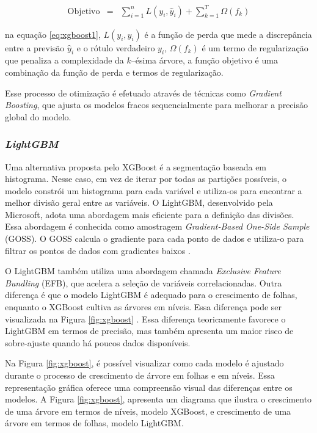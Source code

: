\begin{eqnarray}
	 \text{Objetivo} &=& \sum_{i=1}^{n} L(y_i, \hat{y}_i) + \sum_{k=1}^{T} \Omega(f_k) \label{eq:xgboost1}
\end{eqnarray}

 
 \noindent na equação \eqref{eq:xgboost1}, $ L(y_i, \hat{y}_i) $ é a função de perda que mede a discrepância entre a previsão $ \hat{y}_i $ e o rótulo verdadeiro $ y_i $, $ \Omega(f_k) $ é um termo de regularização que penaliza a complexidade da $ k $--ésima árvore, a função objetivo é uma combinação da função de perda e termos de regularização.
 
 Esse processo de otimização é efetuado através de técnicas como \textit{Gradient Boosting}, que ajusta os modelos fracos sequencialmente para melhorar a precisão global do modelo.
 

 
 \subsubsection{\textit{LightGBM}}
 
 Uma alternativa proposta pelo XGBoost é a segmentação baseada em histograma. Nesse caso, em vez de iterar por todas as partições possíveis, o modelo constrói um histograma para cada variável e utiliza-os para encontrar a melhor divisão geral entre as variáveis. O LightGBM, desenvolvido pela Microsoft, adota uma abordagem mais eficiente para a definição das divisões. Essa abordagem é conhecida como amostragem \textit{Gradient-Based One-Side Sample} (GOSS). O GOSS calcula o gradiente para cada ponto de dados e utiliza-o para filtrar os pontos de dados com gradientes baixos \cite{SUN2020101084}. 
 
 O LightGBM também utiliza uma abordagem chamada \textit{Exclusive Feature Bundling} (EFB), que acelera a seleção de variáveis correlacionadas. 
 Outra diferença é que o modelo LightGBM é adequado para o crescimento de folhas, enquanto o XGBoost cultiva as árvores em níveis. Essa diferença pode ser visualizada na Figura \ref{fig:xgboost} \cite{YE2023407}. Essa diferença teoricamente favorece o LightGBM em termos de precisão, mas também apresenta um maior risco de sobre-ajuste quando há poucos dados disponíveis. 
 
 Na Figura \ref{fig:xgboost}, é possível visualizar como cada modelo é ajustado durante o processo de crescimento de árvore em folhas e em níveis. Essa representação gráfica oferece uma compreensão visual das diferenças entre os modelos. A Figura \ref{fig:xgboost}, apresenta um diagrama que ilustra o crescimento de uma árvore em termos de níveis, modelo XGBoost, e crescimento de uma árvore em termos de folhas, modelo LightGBM.
 
